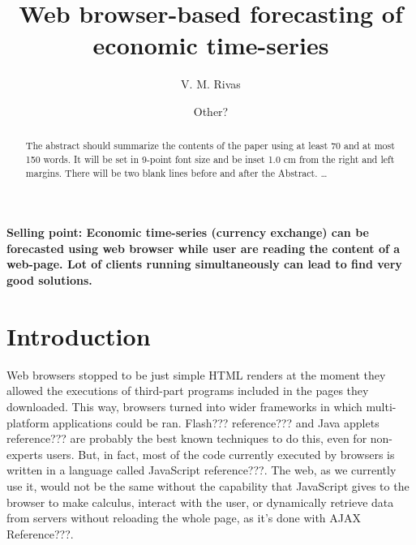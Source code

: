 \documentclass{llncs}
\begin{document}
%
%
\mainmatter              %
%
\title{Web browser-based forecasting of economic time-series}
%
%
\author{
V. M. Rivas 
\and Other?
}
%
%
%

\maketitle              %
\textbf{Selling point: Economic time-series (currency exchange) can be forecasted using web browser while user are reading the content of a web-page. Lot of clients running simultaneously can lead to find very good solutions.}
\begin{abstract}
{\color{red}
The abstract should summarize the contents of the paper
using at least 70 and at most 150 words. It will be set in 9-point
font size and be inset 1.0 cm from the right and left margins.
There will be two blank lines before and after the Abstract. \dots
}
\end{abstract}
%
\section{Introduction}
Web browsers stopped to be just simple HTML renders at the moment they allowed the executions of third-part programs included in the pages they downloaded. This way, browsers turned into wider frameworks in which multi-platform applications could be ran. Flash??? reference??? and Java applets reference??? are probably the best known techniques to do this, even for non-experts users. But, in fact, most of the code currently executed by browsers is written in a language called JavaScript reference???. The web, as we currently use it, would not be the same without the capability that JavaScript gives to the browser to make calculus, interact with the user, or dynamically retrieve data from servers without reloading the whole page, as it's done with AJAX Reference???. 
\end{document}
